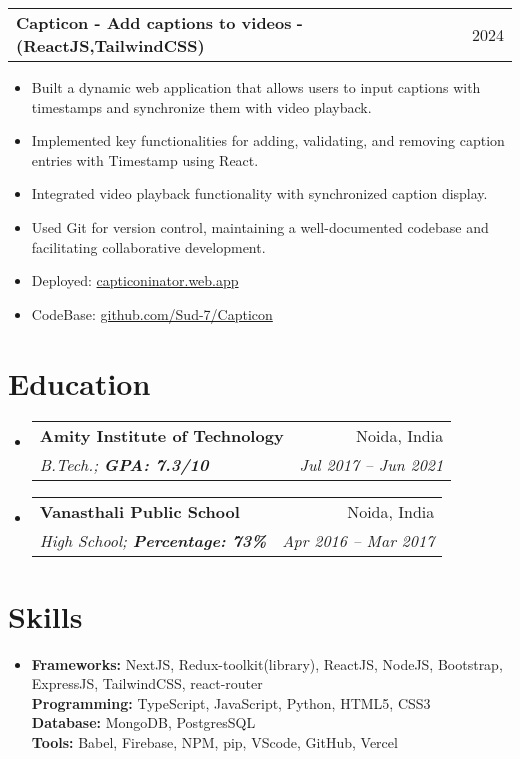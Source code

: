 \documentclass[letterpaper,10pt]{article}
\makeatletter
\newcommand{\resumeItem}[1]{
  \item\small{
    {#1 \vspace{-2pt}}
  }
}
\newcommand{\resumeEducationHeading}[4]{
  \vspace{-2pt}\item
    \begin{tabular*}{0.97\textwidth}[t]{l@{\extracolsep{\fill}}r}
      \textbf{#1} & #2 \\
      \textit{\small#3} & \textit{\small #4} \\
    \end{tabular*}\vspace{-5pt}
}
\newcommand{\resumeProjectHeading}[2]{
    \vspace{-2pt}\item
    \begin{tabular*}{0.97\textwidth}[t]{l@{\extracolsep{\fill}}r}
      \small#1 & #2 \\
    \end{tabular*}\vspace{-7pt}
}
\newcommand{\resumeSubHeadingListStart}{\begin{itemize}[leftmargin=0.15in, label={}]}
\newcommand{\resumeSubHeadingListEnd}{\end{itemize}}
\newcommand{\resumeItemListStart}{\begin{itemize}}
\newcommand{\resumeItemListEnd}{\end{itemize}\vspace{-5pt}}
\makeatother
\begin{document}
    \resumeProjectHeading
      {\textbf{Capticon - Add captions to videos} \textbf{- (ReactJS,TailwindCSS)}}{2024}
        \resumeItemListStart
            \resumeItem{Built a dynamic web application that allows users to input captions with timestamps and synchronize them with video playback.}
            \resumeItem{Implemented key functionalities for adding, validating, and removing caption entries with Timestamp using React.}
            \resumeItem{Integrated video playback functionality with synchronized caption display.}
            \resumeItem{Used Git for version control, maintaining a well-documented codebase and facilitating collaborative development.}
           
            \resumeItem{Deployed: \href{https://capticoninator.web.app/}{capticoninator.web.app}}
            \resumeItem{CodeBase: \href{https://github.com/Sud-7/Capticon}{github.com/Sud-7/Capticon}}
        \resumeItemListEnd


\section{Education}
  \vspace{1pt}
  \resumeSubHeadingListStart
    \resumeEducationHeading
      {Amity Institute of Technology}{Noida, India}
      {B.Tech.; \textbf{GPA: 7.3/10}}{Jul 2017 -- Jun 2021}
    \resumeEducationHeading
      {Vanasthali Public School}{Noida, India}
      {High School; \textbf{Percentage: 73\%}}{Apr 2016 -- Mar 2017}
  \resumeSubHeadingListEnd

\section{Skills}
  \vspace{2pt}
  \resumeSubHeadingListStart
    \item{
        \textbf{Frameworks:}{ NextJS, Redux-toolkit(library), ReactJS, NodeJS, Bootstrap, ExpressJS, TailwindCSS, react-router} \\
        \textbf{Programming:}{ TypeScript, JavaScript, Python, HTML5, CSS3} \\
        \textbf{Database:}{ MongoDB, PostgresSQL} \\
        \textbf{Tools:}{ Babel, Firebase, NPM, pip,  VScode, GitHub, Vercel} \\
    }
  \resumeSubHeadingListEnd
\end{document}
